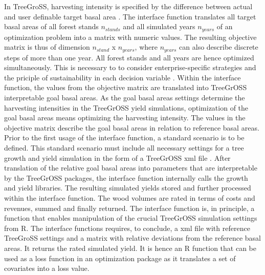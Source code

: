 In TreeGroSS, harvesting intensity is specified by the difference between actual and user definable target basal area \citep[p. 149-150]{hansen_2014}. The interface function translates all target basal areas of all forest stands $n_{stands}$ and all simulated years $n_{years}$ of an optimization problem into a matrix with numeric values. The resulting objective matrix is thus of dimension $n_{stand}$ x $n_{years}$, where $n_{years}$ can also describe discrete steps of more than one year. All forest stands and all years are hence optimized simultaneously. This is necessary to to consider enterprise-specific strategies and the priciple of sustainability in each decision variable \citep[p. 351]{mohring_2010}. Within the interface function, the values from the objective matrix are translated into TreeGrOSS interpretable goal basal areas. As the goal basal areas settings determine the harvesting intensities in the TreeGrOSS yield simulations, optimization of the goal basal areas means optimizing the harvesting intensity. The values in the objective matrix describe the goal basal areas in relation to reference basal areas. Prior to the first usage of the interface function, a standard scenario is to be defined. This standard scenario must include all necessary settings for a tree growth and yield simulation in the form of a TreeGrOSS xml file \citep[p. 30]{hansen_2014}. After translation of the relative goal basal areas into parameters that are interpretable by the TreeGrOSS packages, the interface function internally calls the growth and yield libraries. The resulting simulated yields stored and further processed within the interface function. The wood volumes are rated in terms of costs and revenues, summed and finally returned. The interface function is, in principle, a function that enables manipulation of the crucial TreeGrOSS simulation settings from R. The interface functions requires, to conclude, a xml file with reference TreeGroSS settings and a matrix with relative deviations from the reference basal areas. It returns the rated simulated yield. It is hence an R function that can be used as a loss function in an optimization package as it translates a set of covariates into a loss value.

